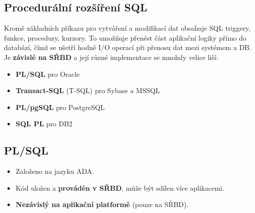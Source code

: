\subsection{Procedurální rozšíření SQL}
Kromě základních příkazu pro vytváření a modifikací dat obsahuje SQL triggery, funkce, procedury, kurzory. To umožňuje přenést část aplikační logiky přímo do databází, čímž se ušetří hodně I/O operací při přenosu dat mezi systémem a DB. Je \textbf{závislé na SŘBD} a její různé implementace se mnohdy velice liší:
\begin{itemize}
\item \textbf{PL/SQL} pro Oracle
\item \textbf{Transact-SQL} (T-SQL) pro Sybase a MSSQL
\item \textbf{PL/pgSQL} pro PostgreSQL
\item \textbf{SQL PL} pro DB2
\end{itemize}

\subsection{PL/SQL}
\begin{itemize}
\item Založeno na jazyku ADA.
\item Kód uložen a \textbf{prováděn v SŘBD}, může být sdílen více aplikacemi.
\item \textbf{Nezávislý na aplikační platformě} (pouze na SŘBD).
\end{itemize}

